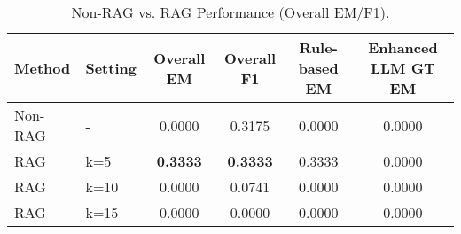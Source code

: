 \begin{table}[t]
\centering
\caption{Non-RAG vs. RAG Performance (Overall EM/F1).}
\label{tab:rag_nonrag_results}
\begin{tabular}{llcccc}
\hline
Method & Setting & Overall EM & Overall F1 & Rule-based EM & Enhanced LLM GT EM \\ 
\hline
Non-RAG & - & 0.0000 & 0.3175 & 0.0000 & 0.0000 \\
RAG & k=5 & \textbf{0.3333} & \textbf{0.3333} & 0.3333 & 0.0000 \\
RAG & k=10 & 0.0000 & 0.0741 & 0.0000 & 0.0000 \\
RAG & k=15 & 0.0000 & 0.0000 & 0.0000 & 0.0000 \\
\hline
\end{tabular}
\end{table}